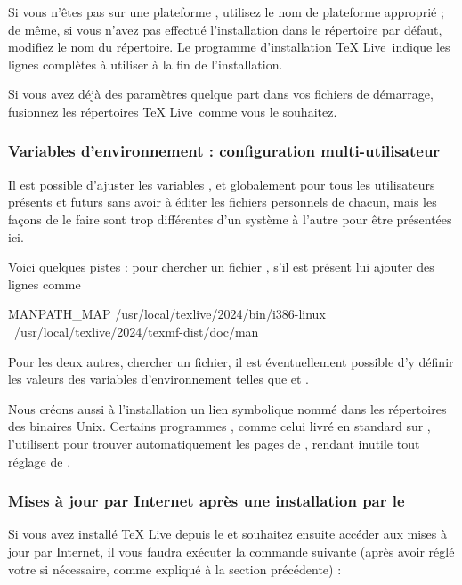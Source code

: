 \documentclass[german, english, french, 12pt]{article}
\renewcommand{\TL}{\TeX{} Live\xspace}%
\begin{document}
Si vous n'êtes pas sur une plateforme , utilisez le nom de
plateforme approprié ; de même, si vous n'avez pas effectué l'installation dans
le répertoire par défaut, modifiez le nom du répertoire. Le programme
d'installation \TL\ indique les lignes complètes à utiliser à la fin de
l'installation.

Si vous avez déjà des paramètres  quelque part dans vos fichiers
de démarrage, fusionnez les répertoires \TL\ comme vous le souhaitez.

\subsubsection{Variables d'environnement : configuration multi-utilisateur}
\label{sec:envglobal}

Il est possible d'ajuster les variables ,  et
 globalement pour tous les utilisateurs présents et futurs
sans avoir à éditer les fichiers personnels de chacun, mais les façons de le
faire sont trop différentes d'un système à l'autre pour être présentées ici.

Voici quelques pistes : pour  chercher un fichier
, s'il est présent lui ajouter des lignes comme
\begin{sverbatim}
MANPATH_MAP /usr/local/texlive/2024/bin/i386-linux \
            /usr/local/texlive/2024/texmf-dist/doc/man
\end{sverbatim}
Pour les deux autres, chercher un fichier, il est
éventuellement possible d'y définir les valeurs des variables d'environnement
telles que \envname{PATH} et \envname{INFOPATH}.

Nous créons aussi à l'installation un lien symbolique nommé  dans les
répertoires des binaires Unix. Certains programmes , comme celui livré
en standard sur \macOS{}, l'utilisent pour trouver automatiquement les pages de
\code{man}, rendant inutile tout réglage de \envname{MANPATH}.

\subsubsection{Mises à jour par Internet après une installation par le
  \protect\DVD}
\label{sec:dvd-install-net-updates}

Si vous avez installé \TL{} depuis le \DVD{} et souhaitez ensuite accéder aux
mises à jour par Internet, il vous faudra exécuter la commande suivante (après
avoir réglé votre \envname{PATH} si nécessaire, comme expliqué à la section
précédente) :
\end{document}
